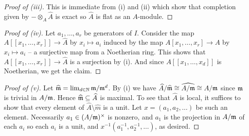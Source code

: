\begin{proof}[Proof of (iii)]
    This is immediate from (i) and (ii) which show that completion given by $-\otimes_{A}\widehat{A}$ is exact so $\widehat{A}$ is flat as an $A$-module.  
\end{proof}
\begin{proof}[Proof of (iv)]
    Let $a_{1},\dots,a_{r}$ be generators of $I$. Consider the map $A[[x_{1},\dots,x_{r}]]\to\widehat{A}$ by $x_{i}\mapsto a_{i}$ induced by the map $A[x_{1},\dots,x_{r}]\to A$ by $x_{i}\mapsto a_{i}$ -- a surjective map from a Noetherian ring. This shows that $A[[x_{1},\dots,x_{r}]]\to\widehat{A}$ is a surjection by (i). And since $A[[x_{1},\dots,x_{d}]]$ is Noetherian, we get the claim. 
\end{proof}
\begin{proof}[Proof of (v)]
    Let $\widehat{\mathfrak{m}}=\lim_{d\in\mathbb{N}}\mathfrak{m}/\mathfrak{m}^{d}$. By (i) we have $\widehat{A}/\widehat{\mathfrak{m}}\cong\widehat{A/\mathfrak{m}}\cong A/\mathfrak{m}$ since $\mathfrak{m}$ is trivial in $A/\mathfrak{m}$. Hence $\widehat{\mathfrak{m}}\subseteq\widehat{A}$ is maximal. To see that $\widehat{A}$ is local, it suffices to show that every element of $\widehat{A}\setminus\widehat{m}$ is a unit. Let $x=(a_{1},a_{2},\dots)$ be such an element. Necessarily $a_{1}\in (A/\mathfrak{m})^{\times}$ is nonzero, and $a_{1}$ is the projection in $A/\mathfrak{m}$ of each $a_{i}$ so each $a_{i}$ is a unit, and $x^{-1}(a_{1}^{-1},a_{2}^{-1},\dots)$, as desired. 


\end{proof}
